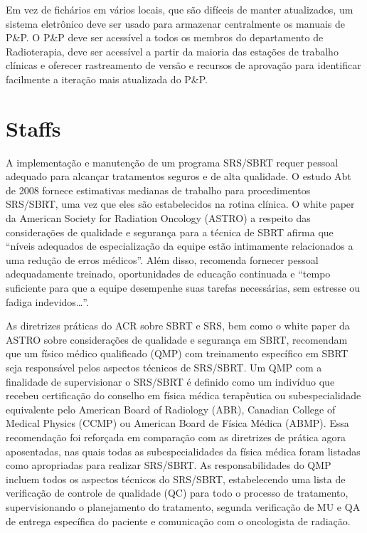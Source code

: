\documentclass[11pt,a4paper]{article}
\begin{document}
	Em vez de fichários em vários locais, que são difíceis de manter atualizados, um sistema eletrônico deve ser usado para armazenar centralmente os manuais de P\&P. O P\&P deve ser acessível a todos os membros do departamento de Radioterapia, deve ser acessível a partir da maioria das estações de trabalho clínicas e oferecer rastreamento de versão e recursos de aprovação para identificar facilmente a iteração mais atualizada do P\&P. 


\section{Staffs}

	A implementação e manutenção de um programa SRS/SBRT requer pessoal adequado para alcançar tratamentos seguros e de alta qualidade. O estudo Abt de 2008 fornece estimativas medianas de trabalho para procedimentos SRS/SBRT, uma vez que eles são estabelecidos na rotina clínica. O white paper da American Society for Radiation Oncology (ASTRO) a respeito das considerações de qualidade e segurança para a técnica de SBRT afirma que “níveis adequados de especialização da equipe estão intimamente relacionados a uma redução de erros médicos”. Além disso, recomenda fornecer pessoal adequadamente treinado, oportunidades de educação continuada e “tempo suficiente para que a equipe desempenhe suas tarefas necessárias, sem estresse ou fadiga indevidos\dots”.

	As diretrizes práticas do ACR sobre SBRT e SRS, bem como o white paper da ASTRO sobre considerações de qualidade e segurança em SBRT, recomendam que um físico médico qualificado (QMP) com treinamento específico em SBRT seja responsável pelos aspectos técnicos de SRS/SBRT. Um QMP com a finalidade de supervisionar o SRS/SBRT é definido como um indivíduo que recebeu certificação do conselho em física médica terapêutica ou subespecialidade equivalente pelo American Board of Radiology (ABR), Canadian College of Medical Physics (CCMP) ou American Board de Física Médica (ABMP). Essa recomendação foi reforçada em comparação com as diretrizes de prática agora aposentadas, nas quais todas as subespecialidades da física médica foram listadas como apropriadas para realizar SRS/SBRT. As responsabilidades do QMP incluem todos os aspectos técnicos do SRS/SBRT, estabelecendo uma lista de verificação de controle de qualidade (QC) para todo o processo de tratamento, supervisionando o planejamento do tratamento, segunda verificação de MU e QA de entrega específica do paciente e comunicação com o oncologista de radiação.
\end{document}
